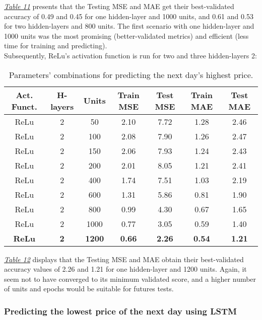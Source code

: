 \hyperref[table:Results for LSTM, Tanh, High]{\textit{Table 11}} presents that the Testing MSE and MAE get their best-validated accuracy of 0.49 and 0.45 for one hidden-layer and 1000 units, and 0.61 and 0.53 for two hidden-layers and 800 units. The first scenario with one hidden-layer and 1000 units was the most promising (better-validated metrics) and efficient (less time for training and predicting).\\

Subsequently, ReLu's activation function is run for two and three hidden-layers 2:

\begin{table}[H]
\centering
\begin{tabular}{ |c|c|c|c|c|c|c| }
\hline
\textbf{Act. Funct.} & \textbf{H-layers} & \textbf{Units} & \textbf{Train MSE} & \textbf{Test MSE} & \textbf{Train MAE} & \textbf{Test MAE}\\
\hline
ReLu & 2 & 50 & 2.10 &	7.72 &	1.28 &	2.46\\
ReLu & 2 & 100 & 2.08 &	7.90 &	1.26 &	2.47\\
ReLu & 2 & 150 & 2.06 &	7.93 &	1.24 &	2.43\\
ReLu & 2 & 200 & 2.01 &	8.05 &	1.21 &	2.41\\
ReLu & 2 & 400 & 1.74 &	7.51 &	1.03 &	2.19\\
ReLu & 2 & 600 & 1.31 &	5.86 &	0.81 &	1.90\\
ReLu & 2 & 800 & 0.99 &	4.30 &	0.67 &	1.65\\
ReLu & 2 & 1000 & 0.77 &	3.05 &	0.59 &	1.40\\
\rowcolor{lightgray} \textbf{ReLu} & \textbf{2} & \textbf{1200} & \textbf{0.66} &	\textbf{2.26} &	\textbf{0.54} &	\textbf{1.21}\\
\hline
\end{tabular}
\label{table:Results for LSTM, ReLu, High}
\caption{Parameters' combinations for predicting the next day's highest price.}
\end{table}

\hyperref[table:Results for LSTM, ReLu, High]{\textit{Table 12}} displays that the Testing MSE and MAE obtain their best-validated accuracy values of 2.26 and 1.21 for one hidden-layer and 1200 units. Again, it seem not to have converged to its minimum validated score, and a higher number of units and epochs would be suitable for futures tests.

\subsubsection{Predicting the lowest price of the next day using LSTM}
\label{chap:Predicting the lowest price of the next day using LSTM}

